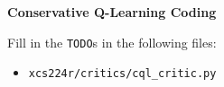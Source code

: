 \item {} \noindent \textbf{Conservative Q-Learning Coding} 

Fill in the \texttt{TODO}s in the following files:

\begin{itemize}
    \item \texttt{xcs224r/critics/cql\_critic.py}
\end{itemize}
